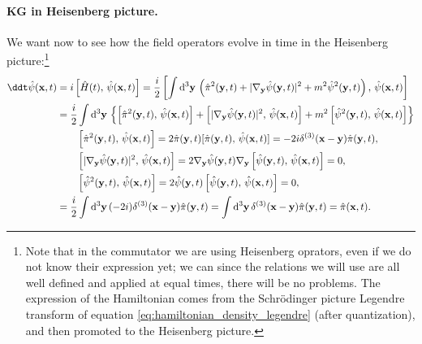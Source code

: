 \paragraph{KG in Heisenberg picture.} We want now to see how the field operators evolve in time in the Heisenberg picture:\footnote{Note that in the commutator we are using Heisenberg oprators, even if we do not know their expression yet; we can since the relations we will use are all well defined and applied at equal times, there will be no problems. The expression of the Hamiltonian comes from the Schrödinger picture Legendre transform of equation \eqref{eq:hamiltonian_density_legendre} (after quantization), and then promoted to the Heisenberg picture.}
\[
    \begin{aligned}
        \ddt \hat{\psi} (\mathbf{x}, t) & = i \left[\hat{H}(t),\,\hat{\psi}(\mathbf{x}, t) \right] = \frac{i}{2} \left[\int \mathrm{d}^3 \mathbf{y} \, \left( \hat{\pi}^2(\mathbf{y},t) + \vert \nabla_{\mathbf{y}}  \hat{\psi}(\mathbf{y},t) \vert^2 + m^2 \hat{\psi}^2(\mathbf{y},t) \right),\,\hat{\psi}(\mathbf{x}, t)\right]                               \\
                                        & = \frac{i}{2} \int \mathrm{d}^3 \mathbf{y} \, \left\{ \left[ \hat{\pi}^2(\mathbf{y},t),\,\hat{\psi}(\mathbf{x}, t) \right] + \left[ \vert \nabla_{\mathbf{y}} \hat{\psi}(\mathbf{y},t) \vert^2,\,\hat{\psi}(\mathbf{x},t)\right] + m^2 \left[ \hat{\psi}^2(\mathbf{y},t),\,\hat{\psi}(\mathbf{x}, t) \right] \right\} \\
                                        & \qquad \left[ \hat{\pi}^2(\mathbf{y},t),\,\hat{\psi}(\mathbf{x}, t) \right] = 2\hat{\pi}(\mathbf{y},t) [\hat{\pi}(\mathbf{y},t),\,\hat{\psi}(\mathbf{x}, t)] = -2i \delta^{(3)}(\mathbf{x}-\mathbf{y}) \hat{\pi}(\mathbf{y},t),                                                                                       \\
                                        & \qquad \left[ \vert \nabla_{\mathbf{y}} \hat{\psi}(\mathbf{y},t) \vert^2,\,\hat{\psi}(\mathbf{x},t)\right] = 2 \nabla_{\mathbf{y}}\hat{\psi}(\mathbf{y},t) \nabla_{\mathbf{y}}\left[\hat{\psi}(\mathbf{y},t) ,\,\hat{\psi}(\mathbf{x},t)\right] = 0,                                                                  \\
                                        & \qquad \left[ \hat{\psi}^2(\mathbf{y},t),\,\hat{\psi}(\mathbf{x}, t) \right] = 2 \hat{\psi}(\mathbf{y},t)\left[ \hat{\psi}(\mathbf{y},t),\,\hat{\psi}(\mathbf{x}, t) \right] =  0,                                                                                                                                    \\
                                        & = \frac{i}{2} \int \mathrm{d}^3 \mathbf{y} \, (-2i) \delta^{(3)}(\mathbf{x}-\mathbf{y}) \hat{\pi}(\mathbf{y},t) = \int \mathrm{d}^3 \mathbf{y} \, \delta^{(3)}(\mathbf{x}-\mathbf{y}) \hat{\pi}(\mathbf{y},t) = \hat{\pi}(\mathbf{x}, t).
    \end{aligned}
\]
